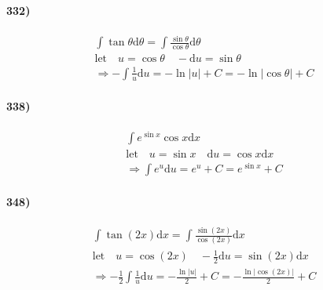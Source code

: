 \begin{multicols*}{2}
        \paragraph*{332)}
        \begin{equation*}
            \begin{gathered}
                \int\tan\theta\mathrm{d}\theta = \int\frac{\sin\theta}{\cos\theta}\mathrm{d}\theta \\
                \text{let} \quad u = \cos\theta \quad -\mathrm{d}u = \sin\theta \\
                \Rightarrow -\int \frac{1}{u}\mathrm{d}u = -\ln|u| + C = \boxed{-\ln|\cos\theta| + C}
            \end{gathered}
        \end{equation*}
        \horizontal

        \paragraph*{338)}
        \begin{equation*}
            \begin{gathered}
                \int e^{\sin x}\cos x\mathrm{d}x    \\
                \text{let} \quad u = \sin x \quad \mathrm{d}u = \cos x\mathrm{d}x  \\
                \Rightarrow \int e^u\mathrm{d}u = e^u + C = \boxed{e^{\sin x} + C}
            \end{gathered}
        \end{equation*}
        \columnbreak

        \paragraph*{348)}
        \begin{equation*}
            \begin{gathered}
                \int\tan(2x)\mathrm{d}x = \int\frac{\sin(2x)}{\cos(2x)}\mathrm{d}x  \\
                \text{let} \quad u = \cos(2x) \quad -\frac{1}{2}\mathrm{d}u = \sin(2x)\mathrm{d}x  \\
                \Rightarrow -\frac{1}{2}\int\frac{1}{u}\mathrm{d}u = -\frac{\ln|u|}{2} + C = \boxed{-\frac{\ln|\cos(2x)|}{2} + C}
            \end{gathered}
        \end{equation*}
        \horizontal


\end{multicols*}
